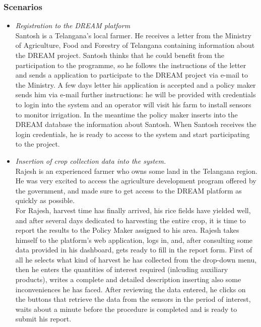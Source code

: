 \documentclass[10pt]{article}
\begin{document}
\subsubsection{Scenarios}
\begin{itemize}
    \item \textit{Registration to the DREAM platform}\\ 
    Santosh is a Telangana's local farmer. He receives a letter from the Ministry of Agriculture, Food and Forestry of Telangana containing information
    about the DREAM project. Santosh thinks that he could benefit from the participation to the programme, so he follows the instructions of the letter and
    sends a application to participate to the DREAM project via e-mail to the Ministry. A few days letter his application is accepted and a policy maker sends him
    via e-mail further instructions: he will be provided with credentials to login into the system and an operator will visit his farm to install sensors to monitor
    irrigation. In the meantime the policy maker inserts into the DREAM database the information about Santosh. When Santosh receives the login credentials, he is 
    ready to access to the system and start participating to the project.
    \item \textit{Insertion of crop collection data into the system.}\\ 
    Rajesh is an experienced farmer who owns some land in the Telangana region. He was very excited to access the agriculture development program offered by the government, 
    and made sure to get access to the DREAM platform as quickly as possible.\\
    For Rajesh, harvest time has finally arrived, his rice fields have yielded well, and after several days dedicated to harvesting the entire crop, it is time to report 
    the results to the Policy Maker assigned to his area. Rajesh takes himself to the platform's web application, logs in, and, after consulting some data provided in his dashboard, 
    gets ready to fill in the report form. First of all he selects what kind of harvest he has collected from the drop-down menu, then he enters the quantities of interest required (inlcuding auxiliary products), 
    writes a complete and detailed description inserting also some inconveniences he has faced. After reviewing the data entered, he clicks on the buttons that retrieve the data from 
    the sensors in the period of interest, waits about a minute before the procedure is completed and is ready to submit his report.

\end{itemize}
\end{document}
